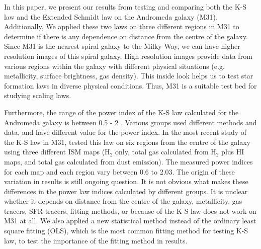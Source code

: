 \documentclass[useAMS,usenatbib]{mn2e}
\begin{document}
In this paper, we present our results from testing and comparing both the K-S law and the Extended Schmidt law on the Andromeda galaxy (M31). Additionally, We applied these two laws on three different regions in M31 to determine if there is any dependence on distance from the centre of the galaxy. Since M31 is the nearest spiral galaxy to the Milky Way, we can have higher resolution images of this spiral galaxy. High resolution images provide data from various regions within the galaxy with different physical situations (e.g. metallicity, surface brightness, gas density). This inside look helps us to test star formation laws in diverse physical conditions. Thus, M31 is a suitable test bed for studying scaling laws. %


Furthermore, the range of the power index of the K-S law calculated for the Andromeda galaxy is between 0.5 - 2 \citep[e.g.,][]{Tabatabaei10,Ford13}. Various groups used different methods and data, and have different value for the power index. In the most recent study of the K-S law in M31, \cite{Ford13} tested this law on six regions from the centre of the galaxy using three different ISM maps (H$_2$ only, total gas calculated from H$_2$ plus HI maps, and total gas calculated from dust emission). The measured power indices for each map and each region vary between 0.6 to 2.03. The origin of these variation in results is still ongoing
question. It is not obvious what makes these differences in the power law indices calculated by different groups. It is unclear whether it depends on distance from the centre of the galaxy, metallicity, gas tracers, SFR tracers, fitting methods, or because of the K-S law does not work on M31 at all. We also applied a new statistical method instead of the ordinary least square fitting (OLS), which is the most common fitting method for testing K-S law, to test the importance of the fitting method in results. %


\end{document}
